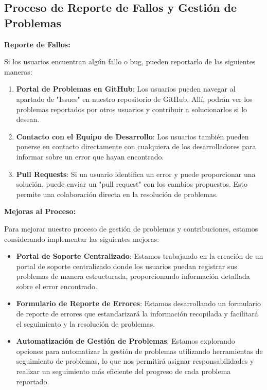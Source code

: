 \documentclass{article}
\begin{document}
    \subsection{Proceso de Reporte de Fallos y Gestión de Problemas}
    
    \textbf{Reporte de Fallos:}
    
    Si los usuarios encuentran algún fallo o bug, pueden reportarlo de las siguientes maneras:
    
    \begin{enumerate}
        \item \textbf{Portal de Problemas en GitHub}: Los usuarios pueden navegar al apartado de "Issues" en nuestro repositorio de GitHub. Allí, podrán ver los problemas reportados por otros usuarios y contribuir a solucionarlos si lo desean.
        
        \item \textbf{Contacto con el Equipo de Desarrollo}: Los usuarios también pueden ponerse en contacto directamente con cualquiera de los desarrolladores para informar sobre un error que hayan encontrado.
        
        \item \textbf{Pull Requests}: Si un usuario identifica un error y puede proporcionar una solución, puede enviar un "pull request" con los cambios propuestos. Esto permite una colaboración directa en la resolución de problemas.
    \end{enumerate}
    
    \textbf{Mejoras al Proceso:}
    
    Para mejorar nuestro proceso de gestión de problemas y contribuciones, estamos considerando implementar las siguientes mejoras:
    
    \begin{itemize}
        \item \textbf{Portal de Soporte Centralizado}: Estamos trabajando en la creación de un portal de soporte centralizado donde los usuarios puedan registrar sus problemas de manera estructurada, proporcionando información detallada sobre el error encontrado.
        
        \item \textbf{Formulario de Reporte de Errores}: Estamos desarrollando un formulario de reporte de errores que estandarizará la información recopilada y facilitará el seguimiento y la resolución de problemas.
        
        \item \textbf{Automatización de Gestión de Problemas}: Estamos explorando opciones para automatizar la gestión de problemas utilizando herramientas de seguimiento de problemas, lo que nos permitirá asignar responsabilidades y realizar un seguimiento más eficiente del progreso de cada problema reportado.
    \end{itemize}
    
\end{document}
